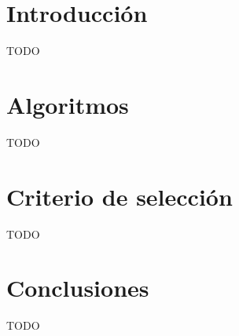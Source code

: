 \documentclass{article}
\begin{document}


\tableofcontents

\cleardoublepage{}

\section{Introducción}
TODO

\section{Algoritmos}
TODO \autocite{foead} \autocite{tongpan} \autocite{javaid} \autocite{mehta}

\section{Criterio de selección}
TODO

\section{Conclusiones}
TODO

\printbibliography{}
\end{document}
